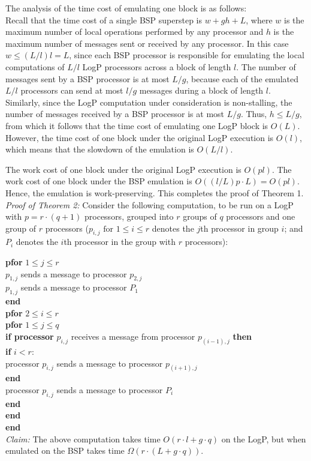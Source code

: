 \documentclass[12pt,a4paper]{article}
\begin{document}
The analysis of the time cost of emulating one block is as follows:\\
Recall that the time cost of a single BSP superstep is $w + gh + L$, where $w$ is the maximum number of local operations performed by any
processor and $h$ is the maximum number of messages sent or received by any processor. In this case $w \leq (L / l)l = L$, since each BSP processor
is responsible for emulating the local computations of $L/l$ LogP processors across a block of length $l$. The number of messages sent by a BSP
processor is at most $L/g$, because each of the emulated $L/l$ processors can send at most $l/g$ messages during a block of length $l$. Similarly,
since the LogP computation under consideration is non-stalling,
the number of messages received by a BSP processor is at most $L/g$. Thus, $h \leq L/g$, from which it follows that the time cost of emulating one
LogP block is $O(L)$. However, the time cost of one block under the original LogP execution is $O(l)$, which means that the slowdown of the
emulation is $O(L/l)$.

The work cost of one block under the original LogP execution is $O(pl)$. The work cost of one block under the BSP emulation is 
$O((l/L)p \cdot L) = O(pl)$. Hence, the emulation is work-preserving. This completes the proof of Theorem 1.\\


\noindent\emph{Proof of Theorem 2:}
Consider the following computation, to be run on a LogP with $p = r \cdot (q + 1)$ processors, grouped into $r$ groups of $q$ processors and one
group of $r$ processors ($p_{i, j} \mbox{ for } 1 \leq i \leq r$ denotes the $j$th processor in group $i$; and $P_i$ denotes the $i$th processor in
the group with $r$ processors):


\newpage
\noindent\textbf{pfor} $1 \leq j \leq r$ \\
\indent $p_{1, j}$ sends a message to processor $p_{2, j}$ \\
\indent $p_{1, j}$ sends a message to processor $P_1$\\
\textbf{end} \\
\textbf{pfor} $2 \leq i \leq r$ \\
\indent \textbf{pfor} $1 \leq j \leq q $ \\
\indent \indent \textbf{if processor} $p_{i, j}$ receives a message from processor $p_{(i-1), j}$ \textbf{then} \\
\indent \indent \indent \textbf{if} $i < r$: \\
\indent \indent \indent \indent processor $p_{i, j}$ sends a message to processor $p_{(i+1), j}$ \\
\indent \indent \indent \textbf{end} \\
\indent \indent \indent processor $p_{i, j}$ sends a message to processor $P_i$ \\
\indent \indent \textbf{end} \\
\indent \textbf{end} \\
\textbf{end} \\
\newpage
\noindent \emph{Claim:} The above computation takes time $O(r \cdot l + g \cdot q)$ on the LogP, but when emulated on the BSP takes time 
$\Omega (r \cdot (L + g \cdot q)) $.
\end{document}
